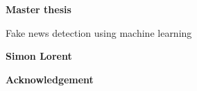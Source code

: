 \thispagestyle{plain}
\begin{center}
    \Large
    \textbf{Master thesis}
 
    \vspace{0.4cm}
    \large
    Fake news detection using machine learning
 
    \vspace{0.4cm}
    \textbf{Simon Lorent}
 
    \vspace{0.9cm}
    \textbf{Acknowledgement}

\end{center}
\blindtext
